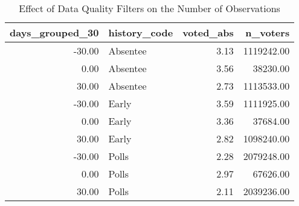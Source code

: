 \begin{table}[!htb]
\centering
\caption{Effect of Data Quality Filters on the Number of Observations} 
\label{table:tab12}
\begingroup\small
\begin{tabular}{rlrr}
  \hline
days\_grouped\_30 & history\_code & voted\_abs & n\_voters \\ 
  \hline
-30.00 & Absentee & 3.13 & 1119242.00 \\ 
  0.00 & Absentee & 3.56 & 38230.00 \\ 
  30.00 & Absentee & 2.73 & 1113533.00 \\ 
  -30.00 & Early & 3.59 & 1111925.00 \\ 
  0.00 & Early & 3.36 & 37684.00 \\ 
  30.00 & Early & 2.82 & 1098240.00 \\ 
  -30.00 & Polls & 2.28 & 2079248.00 \\ 
  0.00 & Polls & 2.97 & 67626.00 \\ 
  30.00 & Polls & 2.11 & 2039236.00 \\ 
   \hline
\end{tabular}
\endgroup
\end{table}
